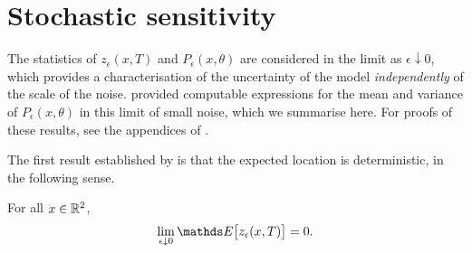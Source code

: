 









\section{Stochastic sensitivity}

The statistics of \(z_\epsilon\left(x,T\right)\) and \(P_\epsilon(x,\theta)\) are considered in the limit as \(\epsilon\downarrow 0\), which provides a characterisation of the uncertainty of the model \emph{independently} of the scale of the noise.
\citet{Balasuriya_2020_StochasticSensitivityComputable} provided computable expressions for the mean and variance of \(P_\epsilon\left(x,\theta\right)\) in this limit of small noise, which we summarise here.
For proofs of these results, see the appendices of \citet{Balasuriya_2020_StochasticSensitivityComputable}.

The first result established by \citet{Balasuriya_2020_StochasticSensitivityComputable} is that the expected location is deterministic, in the following sense.
\begin{theorem}
	For all \(x \in \mathbb{R}^2\),
	\[
		\lim_{\epsilon\downarrow 0}\avg{z_\epsilon(x,T)} = 0.
	\]
\end{theorem}

